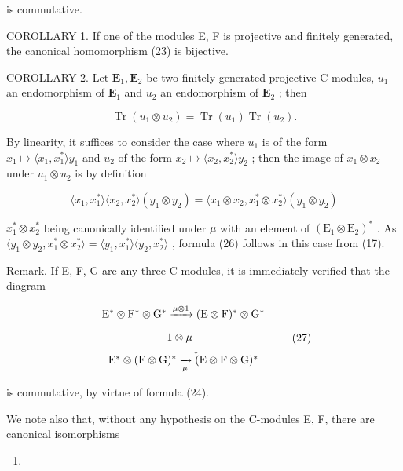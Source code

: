is commutative.

COROLLARY 1. If one of the modules E, F is projective and finitely generated, the canonical homomorphism (23) is bijective.

COROLLARY 2. Let \(\mathbf{E}_1, \mathbf{E}_2\) be two finitely generated projective C-modules, \(u_1\) an endomorphism of \(\mathbf{E}_1\) and \(u_2\) an endomorphism of \(\mathbf{E}_2\) ; then

\[
\operatorname{Tr} (u _ {1} \otimes u _ {2}) = \operatorname{Tr} (u _ {1}) \operatorname{Tr} (u _ {2}).\tag{26}
\]

By linearity, it suffices to consider the case where \(u_{1}\) is of the form \(x_{1} \mapsto \langle x_{1}, x_{1}^{*} \rangle y_{1}\) and \(u_{2}\) of the form \(x_{2} \mapsto \langle x_{2}, x_{2}^{*} \rangle y_{2}\) ; then the image of \(x_{1} \otimes x_{2}\) under \(u_{1} \otimes u_{2}\) is by definition

\[
\langle x _ {1}, x _ {1} ^ {*} \rangle \langle x _ {2}, x _ {2} ^ {*} \rangle (y _ {1} \otimes y _ {2}) = \langle x _ {1} \otimes x _ {2}, x _ {1} ^ {*} \otimes x _ {2} ^ {*} \rangle (y _ {1} \otimes y _ {2})
\]

\(x_{1}^{*}\otimes x_{2}^{*}\) being canonically identified under \(\mu\) with an element of \((\mathrm{E}_{1}\otimes\mathrm{E}_{2})^{*}\) . As \(\langle y_{1}\otimes y_{2},x_{1}^{*}\otimes x_{2}^{*}\rangle=\langle y_{1},x_{1}^{*}\rangle\langle y_{2},x_{2}^{*}\rangle\) , formula (26) follows in this case from (17).

Remark. If E, F, G are any three C-modules, it is immediately verified that the diagram

\[
\begin{array}{c} \mathrm{E} ^ {*} \otimes \mathrm{F} ^ {*} \otimes \mathrm{G} ^ {*} \xrightarrow {\mu \otimes 1} (\mathrm{E} \otimes \mathrm{F}) ^ {*} \otimes \mathrm{G} ^ {*} \\ 1 \otimes \mu \Biggl \downarrow \\ \mathrm{E} ^ {*} \otimes (\mathrm{F} \otimes \mathrm{G}) ^ {*} \xrightarrow [ \mu ]{} (\mathrm{E} \otimes \mathrm{F} \otimes \mathrm{G}) ^ {*} \end{array}\tag{27}
\]

is commutative, by virtue of formula (24).

We note also that, without any hypothesis on the C-modules E, F, there are canonical isomorphisms

\begin{enumerate}
\def\labelenumi{(\arabic{enumi})}
\setcounter{enumi}{27}
\tightlist
\item
\end{enumerate}

